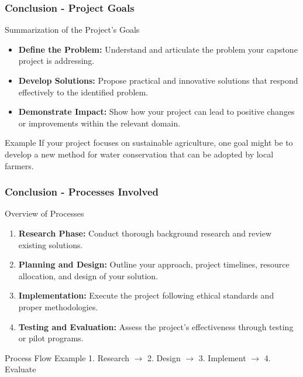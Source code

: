 \documentclass[aspectratio=169]{beamer}
\begin{document}
\begin{frame}[fragile]
    \frametitle{Conclusion - Project Goals}
    \begin{block}{Summarization of the Project's Goals}
        \begin{itemize}
            \item \textbf{Define the Problem:} 
            Understand and articulate the problem your capstone project is addressing.
            
            \item \textbf{Develop Solutions:} 
            Propose practical and innovative solutions that respond effectively to the identified problem.
            
            \item \textbf{Demonstrate Impact:} 
            Show how your project can lead to positive changes or improvements within the relevant domain.
        \end{itemize}
    \end{block}
    
    \begin{block}{Example}
        If your project focuses on sustainable agriculture, one goal might be to develop a new method for water conservation that can be adopted by local farmers.
    \end{block}
\end{frame}

\begin{frame}[fragile]
    \frametitle{Conclusion - Processes Involved}
    \begin{block}{Overview of Processes}
        \begin{enumerate}
            \item \textbf{Research Phase:} Conduct thorough background research and review existing solutions.
            \item \textbf{Planning and Design:} Outline your approach, project timelines, resource allocation, and design of your solution.
            \item \textbf{Implementation:} Execute the project following ethical standards and proper methodologies.
            \item \textbf{Testing and Evaluation:} Assess the project's effectiveness through testing or pilot programs.
        \end{enumerate}
    \end{block}
    
    \begin{block}{Process Flow Example}
        1. Research $\rightarrow$ 2. Design $\rightarrow$ 3. Implement $\rightarrow$ 4. Evaluate
    \end{block}
\end{frame}
\end{document}
